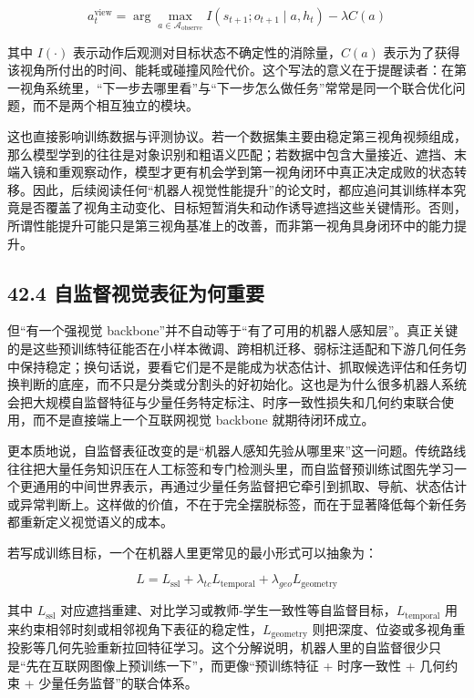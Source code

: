 \begingroup
\scriptsize
\begin{equation*}
a_t^{\text{view}}
=
\arg\max_{a \in \mathcal{A}_{\text{observe}}}
I(s_{t+1}; o_{t+1}\mid a, h_t)-\lambda C(a)
\end{equation*}
\endgroup

其中 \(I(\cdot)\) 表示动作后观测对目标状态不确定性的消除量，\(C(a)\) 表示为了获得该视角所付出的时间、能耗或碰撞风险代价。这个写法的意义在于提醒读者：在第一视角系统里，“下一步去哪里看”与“下一步怎么做任务”常常是同一个联合优化问题，而不是两个相互独立的模块。

这也直接影响训练数据与评测协议。若一个数据集主要由稳定第三视角视频组成，那么模型学到的往往是对象识别和粗语义匹配；若数据中包含大量接近、遮挡、末端入镜和重观察动作，模型才更有机会学到第一视角闭环中真正决定成败的状态转移。因此，后续阅读任何“机器人视觉性能提升”的论文时，都应追问其训练样本究竟是否覆盖了视角主动变化、目标短暂消失和动作诱导遮挡这些关键情形。否则，所谓性能提升可能只是第三视角基准上的改善，而非第一视角具身闭环中的能力提升。

\subsection*{42.4 自监督视觉表征为何重要}


但“有一个强视觉 backbone”并不自动等于“有了可用的机器人感知层”。真正关键的是这些预训练特征能否在小样本微调、跨相机迁移、弱标注适配和下游几何任务中保持稳定；换句话说，要看它们是不是能成为状态估计、抓取候选评估和任务切换判断的底座，而不只是分类或分割头的好初始化。这也是为什么很多机器人系统会把大规模自监督特征与少量任务特定标注、时序一致性损失和几何约束联合使用，而不是直接端上一个互联网视觉 backbone 就期待闭环成立。

更本质地说，自监督表征改变的是“机器人感知先验从哪里来”这一问题。传统路线往往把大量任务知识压在人工标签和专门检测头里，而自监督预训练试图先学习一个更通用的中间世界表示，再通过少量任务监督把它牵引到抓取、导航、状态估计或异常判断上。这样做的价值，不在于完全摆脱标签，而在于显著降低每个新任务都重新定义视觉语义的成本。

若写成训练目标，一个在机器人里更常见的最小形式可以抽象为：

\begingroup
\scriptsize
\begin{equation*}
L = L_{\mathrm{ssl}} + \lambda_{tc} L_{\mathrm{temporal}} + \lambda_{geo} L_{\mathrm{geometry}}
\end{equation*}
\endgroup

其中 \(L_{\mathrm{ssl}}\) 对应遮挡重建、对比学习或教师-学生一致性等自监督目标，\(L_{\mathrm{temporal}}\) 用来约束相邻时刻或相邻视角下表征的稳定性，\(L_{\mathrm{geometry}}\) 则把深度、位姿或多视角重投影等几何先验重新拉回特征学习。这个分解说明，机器人里的自监督很少只是“先在互联网图像上预训练一下”，而更像“预训练特征 + 时序一致性 + 几何约束 + 少量任务监督”的联合体系。

